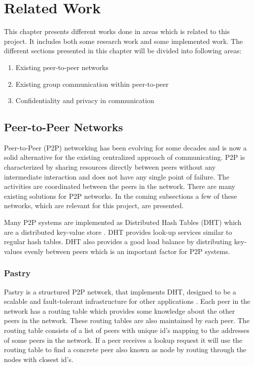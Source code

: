 \chapter{Related Work}
\label{cha:related-work}
This chapter presents different works done in areas which is related to this project. It includes both some research work and some implemented work. 
The different sections presented in this chapter will be divided into following areas:
\begin{enumerate}
	\item Existing peer-to-peer networks
	\item Existing group communication within peer-to-peer  
	\item Confidentiality and privacy in communication
\end{enumerate}

\section{Peer-to-Peer Networks}
\label{sec:p2p-networks}
Peer-to-Peer (P2P) networking has been evolving for some decades and is now a solid alternative for the existing centralized approach of communicating.
P2P is characterized by sharing resources directly between peers without any intermediate interaction and does not have any single point of failure. The activities are coordinated between the peers in the network.
There are many existing solutions for P2P networks. In the coming subsections a few of these networks, which are relevant for this project, are presented. 

Many P2P systems are implemented as Distributed Hash Tables (DHT) which are a distributed key-value store \cite{stoica2001chord}.
DHT provides look-up services similar to regular hash tables.
DHT also provides a good load balance by distributing key-values evenly between peers which is an important factor for P2P systems.

\subsection{Pastry}
Pastry is a structured P2P network, that implements DHT, designed to be a scalable and fault-tolerant infrastructure for other applications \cite{rowstron2001pastry}. 
Each peer in the network has a routing table which provides some knowledge about the other peers in the network. These routing tables are also maintained by each peer.
The routing table consists of a list of peers with unique id's mapping to the addresses of some peers in the network.
If a peer receives a lookup request it will use the routing table to find a concrete peer also known as node by routing through the nodes with closest id's.

